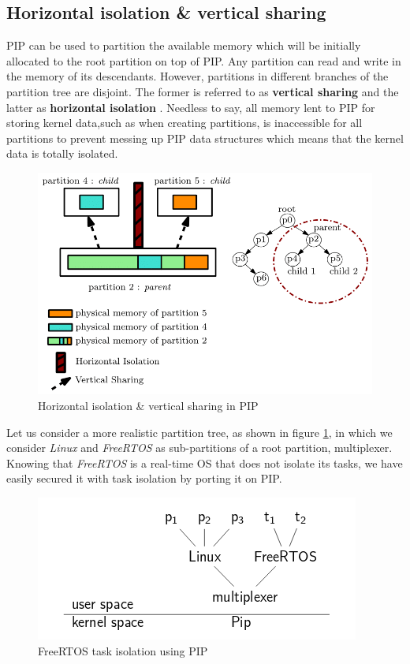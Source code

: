 \subsection{Horizontal isolation \& vertical sharing} \label{properties}

PIP can be used to partition the available memory which will be initially allocated to the root partition on top of PIP. Any partition can read and write in the memory of its descendants. However, partitions in different branches of the partition tree are disjoint. The former is referred to as \textbf{vertical sharing} and the latter as \textbf{horizontal isolation} \cite{PIPKernel}. Needless to say, all memory lent to PIP for storing kernel data,such as when creating partitions, is inaccessible for all partitions to prevent messing up PIP data structures which means that the kernel data is totally isolated.
   
\begin{figure}[!ht]
	\centering 
	\includegraphics[width=0.8\linewidth,frame]{img/memoryIsolShare.png} 
	\caption[Horizontal isolation \& vertical sharing in PIP]{Horizontal isolation \& vertical sharing in PIP \cite{PIPKernel}}
\end{figure}

\noindent Let us consider a more realistic partition tree, as shown in figure \ref{FreeRTOS}, in which we consider \textit{Linux} and \textit{FreeRTOS} as sub-partitions of a root partition, multiplexer. Knowing that \textit{FreeRTOS} is a real-time OS that does not isolate its tasks, we have easily secured it with task isolation by porting it on PIP.

\begin{figure}[!ht] \label{FreeRTOS}
	\centering 
	\includegraphics[scale=0.5,frame]{img/FreeRTOSEx.png} 
	\caption[FreeRTOS task isolation using PIP]{FreeRTOS task isolation using PIP \cite{PIPSlides}}
\end{figure}

